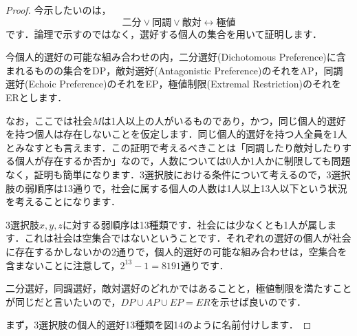 \begin{proof}
今示したいのは，
\begin{equation*}
    二分 \lor 同調 \lor 敵対 \leftrightarrow 極値
\end{equation*}
です．論理で示すのではなく，選好する個人の集合を用いて証明します．

今個人的選好の可能な組み合わせの内，二分選好(Dichotomous Preference)に含まれるものの集合をDP，敵対選好(Antagonistic Preference)のそれをAP，同調選好(Echoic Preference)のそれをEP，極値制限(Extremal Restriction)のそれをERとします．

なお，ここでは社会$M$は1人以上の人がいるものであり，かつ，同じ個人的選好を持つ個人は存在しないことを仮定します．同じ個人的選好を持つ人全員を1人とみなすとも言えます．この証明で考えるべきことは「同調したり敵対したりする個人が存在するか否か」なので，人数については0人か1人かに制限しても問題なく，証明も簡単になります．3選択肢における条件について考えるので，3選択肢の弱順序は13通りで，社会に属する個人の人数は1人以上13人以下という状況を考えることになります．

3選択肢$x,y,z$に対する弱順序は13種類です．社会には少なくとも1人が属します．これは社会は空集合ではないということです．それぞれの選好の個人が社会に存在するかしないかの2通りで，個人的選好の可能な組み合わせは，空集合を含まないことに注意して，$2^{13} - 1 = 8191$通りです．

二分選好，同調選好，敵対選好のどれかではあることと，極値制限を満たすことが同じだと言いたいので，$DP \cup AP \cup EP = ER$を示せば良いのです．

まず，3選択肢の個人的選好13種類を図14のように名前付けします．


\end{proof}
